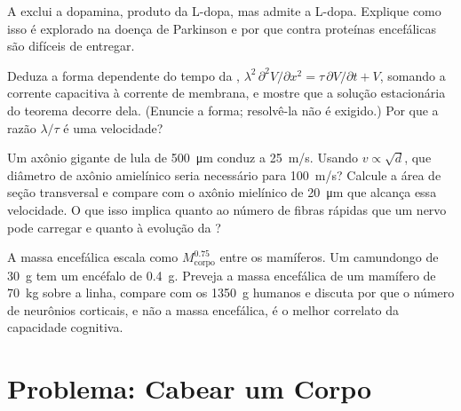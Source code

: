 \begin{exercise}[$\star\star$]\label{exo:b3:nervous-systems:9}
A  exclui a dopamina, produto da L-dopa, mas
admite a L-dopa. Explique como isso é explorado na doença de Parkinson e
por que  contra proteínas encefálicas são difíceis de entregar.
\end{exercise}

\begin{exercise}[$\star\star\star$]\label{exo:b3:nervous-systems:10}
Deduza a forma dependente do tempo da ,
$\lambda^{2}\,\partial^{2}
V/\partial x^{2} = \tau\,\partial V/\partial t + V$, somando a corrente capacitiva à corrente de membrana, e mostre que
a solução estacionária do teorema decorre dela. (Enuncie a forma;
resolvê-la não é exigido.) Por que a razão $\lambda/\tau$ é uma
velocidade?
\end{exercise}

\begin{exercise}[$\star\star\star$]\label{exo:b3:nervous-systems:11}
Um axônio gigante de lula de \qty{500}{\micro m} conduz a \qty{25}{m/s}.
Usando $v \propto \sqrt{d}$, que diâmetro de axônio amielínico seria
necessário para \qty{100}{m/s}? Calcule a área de seção transversal e
compare com o axônio mielínico de \qty{20}{\micro m} que alcança essa
velocidade. O que isso implica quanto ao número de fibras rápidas que um
nervo pode carregar e quanto à evolução da ?
\end{exercise}

\begin{exercise}[$\star\star\star$]\label{exo:b3:nervous-systems:12}
A massa encefálica escala como $M_{\text{corpo}}^{0.75}$ entre os
mamíferos. Um camundongo de \qty{30}{g} tem um encéfalo de \qty{0.4}{g}.
Preveja a massa encefálica de um mamífero de \qty{70}{kg} sobre a linha,
compare com os \qty{1350}{g} humanos e discuta por que o número de
neurônios corticais, e não a massa encefálica, é o melhor correlato da
capacidade cognitiva.
\end{exercise}

\section{Problema: Cabear um Corpo}

